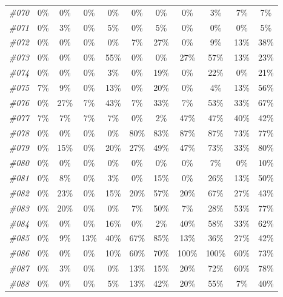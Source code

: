 \begin{table}[t]
\begin{tabular}{ccccccccccc}
    \textit{\#070} & 0\%   & 0\%   & 0\%   & 0\%   & 0\%   & 0\%   & 0\%   & 3\%   & 7\%   & 7\% \\
    \textit{\#071} & 0\%   & 3\%   & 0\%   & 5\%   & 0\%   & 5\%   & 0\%   & 0\%   & 0\%   & 5\% \\
    \textit{\#072} & 0\%   & 0\%   & 0\%   & 0\%   & 7\%   & 27\%  & 0\%   & 9\%   & 13\%  & 38\% \\
    \textit{\#073} & 0\%   & 0\%   & 0\%   & 55\%  & 0\%   & 0\%   & 27\%  & 57\%  & 13\%  & 23\% \\
    \textit{\#074} & 0\%   & 0\%   & 0\%   & 3\%   & 0\%   & 19\%  & 0\%   & 22\%  & 0\%   & 21\% \\
    \textit{\#075} & 7\%   & 9\%   & 0\%   & 13\%  & 0\%   & 20\%  & 0\%   & 4\%   & 13\%  & 56\% \\
    \textit{\#076} & 0\%   & 27\%  & 7\%   & 43\%  & 7\%   & 33\%  & 7\%   & 53\%  & 33\%  & 67\% \\
    \textit{\#077} & 7\%   & 7\%   & 7\%   & 7\%   & 0\%   & 2\%   & 47\%  & 47\%  & 40\%  & 42\% \\
    \textit{\#078} & 0\%   & 0\%   & 0\%   & 0\%   & 80\%  & 83\%  & 87\%  & 87\%  & 73\%  & 77\% \\
    \textit{\#079} & 0\%   & 15\%  & 0\%   & 20\%  & 27\%  & 49\%  & 47\%  & 73\%  & 33\%  & 80\% \\
    \textit{\#080} & 0\%   & 0\%   & 0\%   & 0\%   & 0\%   & 0\%   & 0\%   & 7\%   & 0\%   & 10\% \\
    \textit{\#081} & 0\%   & 8\%   & 0\%   & 3\%   & 0\%   & 15\%  & 0\%   & 26\%  & 13\%  & 50\% \\
    \textit{\#082} & 0\%   & 23\%  & 0\%   & 15\%  & 20\%  & 57\%  & 20\%  & 67\%  & 27\%  & 43\% \\
    \textit{\#083} & 0\%   & 20\%  & 0\%   & 0\%   & 7\%   & 50\%  & 7\%   & 28\%  & 53\%  & 77\% \\
    \textit{\#084} & 0\%   & 0\%   & 0\%   & 16\%  & 0\%   & 2\%   & 40\%  & 58\%  & 33\%  & 62\% \\
    \textit{\#085} & 0\%   & 9\%   & 13\%  & 40\%  & 67\%  & 85\%  & 13\%  & 36\%  & 27\%  & 42\% \\
    \textit{\#086} & 0\%   & 0\%   & 0\%   & 10\%  & 60\%  & 70\%  & 100\% & 100\% & 60\%  & 73\% \\
    \textit{\#087} & 0\%   & 3\%   & 0\%   & 0\%   & 13\%  & 15\%  & 20\%  & 72\%  & 60\%  & 78\% \\
    \textit{\#088} & 0\%   & 0\%   & 0\%   & 5\%   & 13\%  & 42\%  & 20\%  & 55\%  & 7\%   & 40\% \\

\end{tabular}
\end{table}
